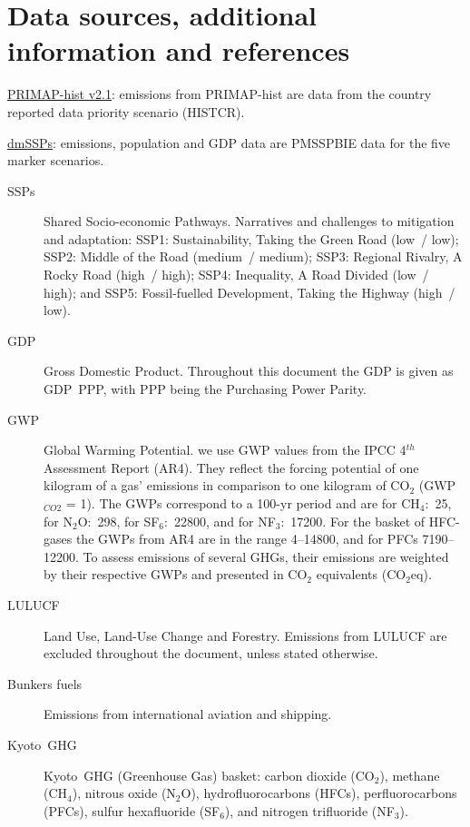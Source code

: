 \documentclass[12pt]{article}
\begin{document}
 \newpage %
 \section{Data sources, additional information and references}
 \label{sec:dataSourcesRefs}

 \noindent \href{https://dataservices.gfz-potsdam.de/pik/showshort.php?id=escidoc:4736895}{PRIMAP-hist v2.1}: emissions from PRIMAP-hist are data from the country reported data priority scenario (HISTCR).

 \noindent \href{https://zenodo.org/record/3638137#.X2syXouxU2w}{dmSSPs}: emissions, population and GDP data are PMSSPBIE data for the five marker scenarios.

 \begin{description}
 \item [SSPs] Shared Socio-economic Pathways.
 Narratives and challenges to mitigation and adaptation: 
 SSP1: Sustainability, Taking the Green Road (low~/ low);
 SSP2: Middle of the Road (medium~/ medium);
 SSP3: Regional Rivalry, A Rocky Road (high~/ high);
 SSP4: Inequality, A Road Divided (low~/ high); and
 SSP5: Fossil-fuelled Development, Taking the Highway (high~/ low).
 \item [GDP] Gross Domestic Product. 
 Throughout this document the GDP is given as GDP~PPP, with PPP being the Purchasing Power Parity.
 \item [GWP] Global Warming Potential. we use GWP values from the IPCC 4$^{th}$ Assessment Report (AR4). 
 They reflect the forcing potential of one kilogram of a gas' emissions in comparison to one kilogram of CO$_2$ (GWP$_{CO2}$ = 1). 
 The GWPs correspond to a 100-yr period and are for CH$_4$:~25, for N$_2$O:~298, for SF$_6$:~22800, and for NF$_3$:~17200. 
 For the basket of HFC-gases the GWPs from AR4 are in the range 4--14800, and for PFCs 7190--12200. 
 To assess emissions of several GHGs, their emissions are weighted by their respective GWPs and presented in CO$_2$ equivalents (CO$_2$eq).
 \item [LULUCF] Land Use, Land-Use Change and Forestry. 
 Emissions from LULUCF are excluded throughout the document, unless stated otherwise.
 \item [Bunkers fuels] Emissions from international aviation and shipping.
 \item [Kyoto~GHG] Kyoto~GHG (Greenhouse Gas) basket: carbon dioxide (CO$_2$), methane (CH$_4$), nitrous oxide (N$_2$O), hydrofluorocarbons (HFCs), perfluorocarbons (PFCs), sulfur hexafluoride (SF$_6$), and nitrogen trifluoride (NF$_3$).

\end{description}
\end{document}
